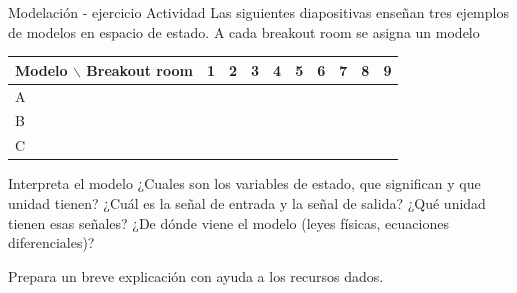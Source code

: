 \documentclass[presentation,aspectratio=1610]{beamer}
\newcommand{\cmark}{\textcolor{green!80!black}{\ding{51}}}
\begin{document}
\begin{frame}[label={sec:org83e8e02}]{Modelación - ejercicio}
\alert{Actividad} Las siguientes diapositivas enseñan tres ejemplos de modelos en espacio de estado. A cada breakout room se asigna un modelo

\begin{center}
\begin{tabular}{llllrrrrrr}
Modelo $\backslash$ Breakout room & 1 & 2 & 3 & 4 & 5 & 6 & 7 & 8 & 9\\
\hline
A & \cmark & \cmark & \cmark &  &  &  &  &  & \\
B &  &  &  & \cmark & \cmark & \cmark &  &  & \\
C &  &  &  &  &  &  & \cmark & \cmark & \cmark\\
\hline
\end{tabular}
\end{center}

\alert{Interpreta el modelo} ¿Cuales son los variables de estado, que significan y que unidad tienen? ¿Cuál es la señal de entrada y la señal de salida? ¿Qué unidad tienen esas señales? ¿De dónde  viene el modelo (leyes físicas, ecuaciones diferenciales)?

\alert{Prepara un breve explicación} con ayuda a los recursos dados.
\end{frame}
\end{document}
